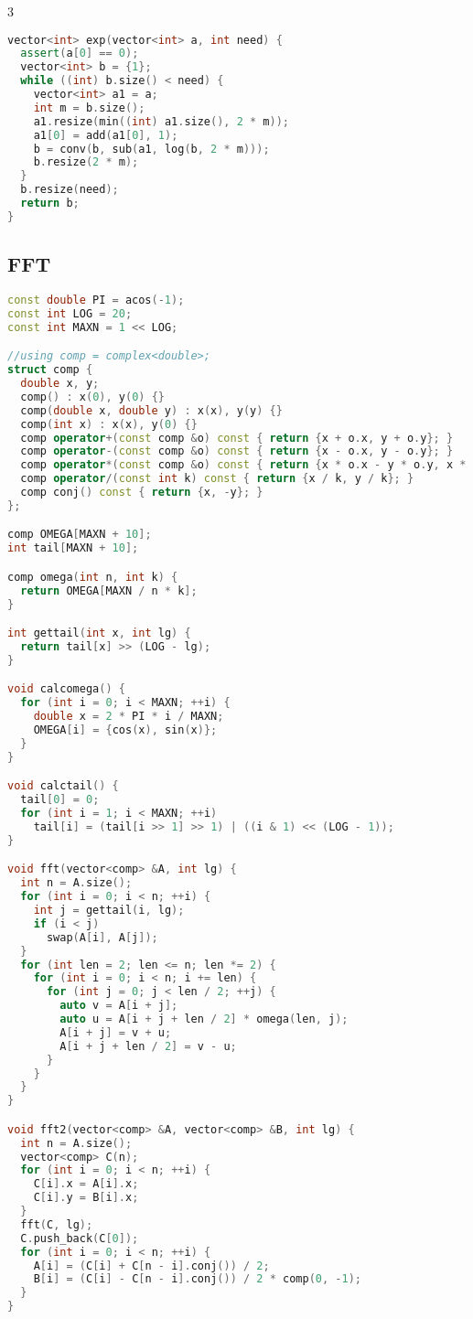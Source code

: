\documentclass[9pt,a4paper,landscape,twosided]{extarticle}
\begin{document}
\begin{multicols*}{3}
\begin{lstlisting}[language=C++]
vector<int> exp(vector<int> a, int need) {
  assert(a[0] == 0);
  vector<int> b = {1};
  while ((int) b.size() < need) {
    vector<int> a1 = a;
    int m = b.size();
    a1.resize(min((int) a1.size(), 2 * m));
    a1[0] = add(a1[0], 1);
    b = conv(b, sub(a1, log(b, 2 * m)));
    b.resize(2 * m);
  }
  b.resize(need);
  return b;
}
\end{lstlisting}

\subsection{FFT}
\begin{lstlisting}[language=C++]
const double PI = acos(-1);
const int LOG = 20;
const int MAXN = 1 << LOG;

//using comp = complex<double>;
struct comp {
  double x, y;
  comp() : x(0), y(0) {}
  comp(double x, double y) : x(x), y(y) {}
  comp(int x) : x(x), y(0) {}
  comp operator+(const comp &o) const { return {x + o.x, y + o.y}; }
  comp operator-(const comp &o) const { return {x - o.x, y - o.y}; }
  comp operator*(const comp &o) const { return {x * o.x - y * o.y, x * o.y + y * o.x}; }
  comp operator/(const int k) const { return {x / k, y / k}; }
  comp conj() const { return {x, -y}; }
};

comp OMEGA[MAXN + 10];
int tail[MAXN + 10];

comp omega(int n, int k) {
  return OMEGA[MAXN / n * k];
}

int gettail(int x, int lg) {
  return tail[x] >> (LOG - lg);
}

void calcomega() {
  for (int i = 0; i < MAXN; ++i) {
    double x = 2 * PI * i / MAXN;
    OMEGA[i] = {cos(x), sin(x)};
  }
}

void calctail() {
  tail[0] = 0;
  for (int i = 1; i < MAXN; ++i)
    tail[i] = (tail[i >> 1] >> 1) | ((i & 1) << (LOG - 1));
}

void fft(vector<comp> &A, int lg) {
  int n = A.size();
  for (int i = 0; i < n; ++i) {
    int j = gettail(i, lg);
    if (i < j)
      swap(A[i], A[j]);
  }
  for (int len = 2; len <= n; len *= 2) {
    for (int i = 0; i < n; i += len) {
      for (int j = 0; j < len / 2; ++j) {
        auto v = A[i + j];
        auto u = A[i + j + len / 2] * omega(len, j);
        A[i + j] = v + u;
        A[i + j + len / 2] = v - u;
      }
    }
  }
}

void fft2(vector<comp> &A, vector<comp> &B, int lg) {
  int n = A.size();
  vector<comp> C(n);
  for (int i = 0; i < n; ++i) {
    C[i].x = A[i].x;
    C[i].y = B[i].x;
  }
  fft(C, lg);
  C.push_back(C[0]);
  for (int i = 0; i < n; ++i) {
    A[i] = (C[i] + C[n - i].conj()) / 2;
    B[i] = (C[i] - C[n - i].conj()) / 2 * comp(0, -1);
  }
}


\end{lstlisting}
\end{multicols*}
\end{document}
